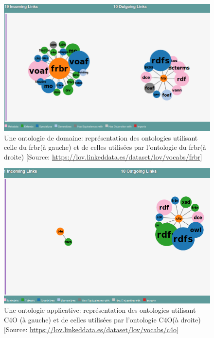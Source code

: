 \begin{figure}[!h]
	\centering
	\includegraphics[width=14cm]{images/onto_frbr.png}
	\caption[Une ontologie de domaine: FRBR]{Une ontologie de domaine: représentation des ontologies utilisant celle du \ac{frbr}(à gauche) et de celles utilisées par l'ontologie du \ac{frbr}(à droite) [Source: \url{https://lov.linkeddata.es/dataset/lov/vocabs/frbr}]}
	\label{onto_frbr}
\end{figure}

\begin{figure}[!h]
	\centering
	\includegraphics[width=14cm]{images/onto_c4o.png}
	\caption[Une ontologie applicative: C4O]{Une ontologie applicative: représentation des ontologies utilisant C4O (à gauche) et de celles utilisées par l'ontologie C4O(à droite) [Source: \url{https://lov.linkeddata.es/dataset/lov/vocabs/c4o}]}
	\label{onto_c4o}
\end{figure}